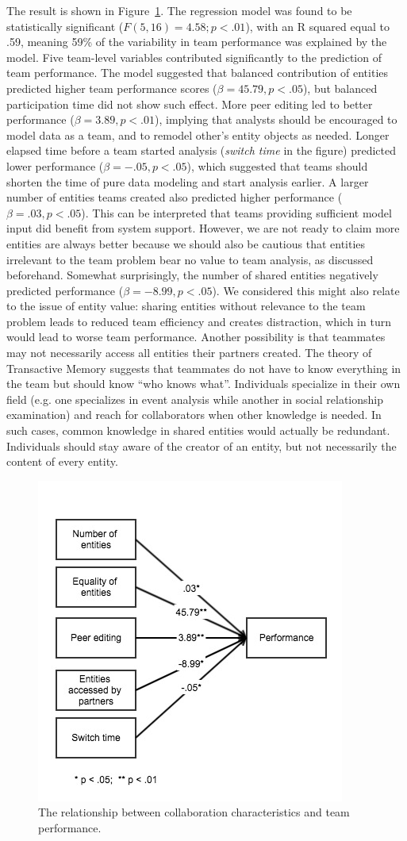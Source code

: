 The result is shown in Figure~\ref{fig:regression}. The regression model was found to be statistically significant ($F(5,16)=4.58; p<.01$), with an R squared equal to .59, meaning 59\% of the variability in team performance was explained by the model. Five team-level variables contributed significantly to the prediction of team performance. The model suggested that balanced contribution of entities predicted higher team performance scores ($\beta=45.79, p<.05$), but balanced participation time did not show such effect. More peer editing led to better performance ($\beta=3.89, p<.01$), implying that analysts should be encouraged to model data as a team, and to remodel other's entity objects as needed. Longer elapsed time before a team started analysis (\emph{switch time} in the figure) predicted lower performance ($\beta=-.05, p<.05$), which suggested that teams should shorten the time of pure data modeling and start analysis earlier. A larger number of entities teams created also predicted higher performance ($\beta=.03, p<.05$). This can be interpreted that teams providing sufficient model input did benefit from system support. However, we are not ready to claim more entities are always better because we should also be cautious that entities irrelevant to the team problem bear no value to team analysis, as discussed beforehand. Somewhat surprisingly, the number of shared entities negatively predicted performance ($\beta=-8.99, p<.05$).
We considered this might also relate to the issue of entity value: sharing entities without relevance to the team problem leads to reduced team efficiency and creates distraction, which in turn would lead to worse team performance. Another possibility is that teammates may not necessarily access all entities their partners created. The theory of Transactive Memory \citep{Wegner1987} suggests that teammates do not have to know everything in the team but should know ``who knows what''. Individuals specialize in their own field (e.g. one specializes in event analysis while another in social relationship examination) and reach for collaborators when other knowledge is needed. In such cases, common knowledge in shared entities would actually be redundant. Individuals should stay aware of the creator of an entity, but not necessarily the content of every entity.

\begin{figure}
\centering
\includegraphics[width=0.6\columnwidth]{04-Study_one/img/team_analysis.jpg}
\caption{The relationship between collaboration characteristics and team performance.\label{fig:regression}}
\end{figure}
